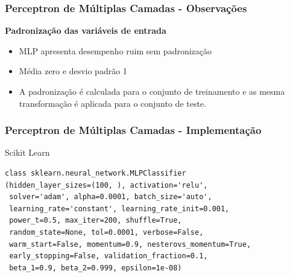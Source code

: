 \documentclass{beamer}
\begin{document}
\begin{frame}
\frametitle{Perceptron de Múltiplas Camadas - Observações}
\textbf{Padronização das variáveis de entrada}
\begin{itemize}
\item MLP apresenta desempenho ruim sem padronização
\item Média zero e desvio padrão 1
\item A padronização é calculada para o conjunto de treinamento e as mesma transformação é aplicada para o conjunto de teste.
\end{itemize}
\end{frame}

\begin{frame}[fragile] %
\frametitle{Perceptron de Múltiplas Camadas - Implementação}
\begin{block}{Scikit Learn}
\begin{verbatim}
class sklearn.neural_network.MLPClassifier
(hidden_layer_sizes=(100, ), activation='relu',
 solver='adam', alpha=0.0001, batch_size='auto',
 learning_rate='constant', learning_rate_init=0.001,
 power_t=0.5, max_iter=200, shuffle=True, 
 random_state=None, tol=0.0001, verbose=False,
 warm_start=False, momentum=0.9, nesterovs_momentum=True,
 early_stopping=False, validation_fraction=0.1,
 beta_1=0.9, beta_2=0.999, epsilon=1e-08)
\end{verbatim}
\end{block}

\end{frame}
\end{document}
